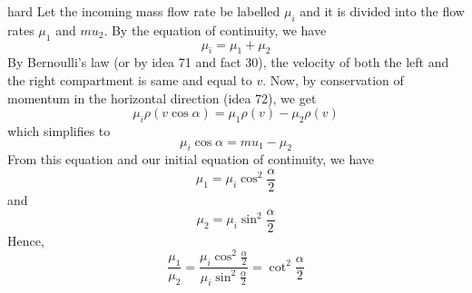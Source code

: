 \begin{solution}{hard}
Let the incoming mass flow rate be labelled $\mu_i$ and it is divided into the flow rates $\mu_1$ and $mu_2$. By the equation of continuity, we have$$\mu_i = \mu_1 + \mu_2$$By Bernoulli's law (or by idea 71 and fact 30), the velocity of both the left and the right compartment is same and equal to $v$. Now, by conservation of momentum in the horizontal direction (idea 72), we get$$\mu_i \rho (v\cos{\alpha}) = \mu_1 \rho (v) - \mu_2 \rho (v)$$which simplifies to$$\mu_i \cos{\alpha} = mu_1 - \mu_2$$From this equation and our initial equation of continuity, we have$$ \mu_1 = \mu_i \cos^{2}{\frac{\alpha}{2}}$$and$$\mu_2 = \mu_i \sin^{2}{\frac{\alpha}{2}}$$Hence,$$\frac{\mu_1}{\mu_2} = \frac{\mu_i \cos^{2}{\frac{\alpha}{2}}}{\mu_i \sin^{2}{\frac{\alpha}{2}}} = \boxed{\cot^{2}{\frac{\alpha}{2}}}$$
\end{solution}
